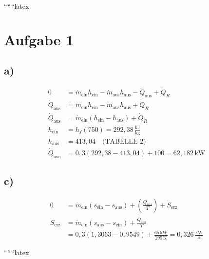 
``````latex

\section*{Aufgabe 1}

\subsection*{a)}

\begin{align*}
0 &= \dot{m}_{\text{ein}} h_{\text{ein}} - \dot{m}_{\text{aus}} h_{\text{aus}} - \dot{Q}_{\text{aus}} + \dot{Q}_R \\
\dot{Q}_{\text{aus}} &= \dot{m}_{\text{ein}} h_{\text{ein}} - \dot{m}_{\text{aus}} h_{\text{aus}} + \dot{Q}_R \\
\dot{Q}_{\text{aus}} &= \dot{m}_{\text{ein}} (h_{\text{ein}} - h_{\text{aus}}) + \dot{Q}_R \\
h_{\text{ein}} &= h_f(750) = 292,38 \, \frac{\text{kJ}}{\text{kg}} \\
h_{\text{aus}} &= 413,04 \quad \text{(TABELLE 2)} \\
\dot{Q}_{\text{aus}} &= 0,3 \left( 292,38 - 413,04 \right) + 100 = 62,182 \, \text{kW}
\end{align*}

\subsection*{c)}

\begin{align*}
0 &= \dot{m}_{\text{ein}} (s_{\text{ein}} - s_{\text{aus}}) + \left( \frac{\dot{Q}_{\text{aus}}}{T} \right) + \dot{S}_{\text{erz}} \\
\dot{S}_{\text{erz}} &= \dot{m}_{\text{ein}} (s_{\text{aus}} - s_{\text{ein}}) + \frac{\dot{Q}_{\text{aus}}}{T} \\
&= 0,3 \left( 1,3063 - 0,9549 \right) + \frac{65 \, \text{kW}}{295 \, \text{K}} = 0,326 \, \frac{\text{kW}}{\text{K}}
\end{align*}

``````latex



